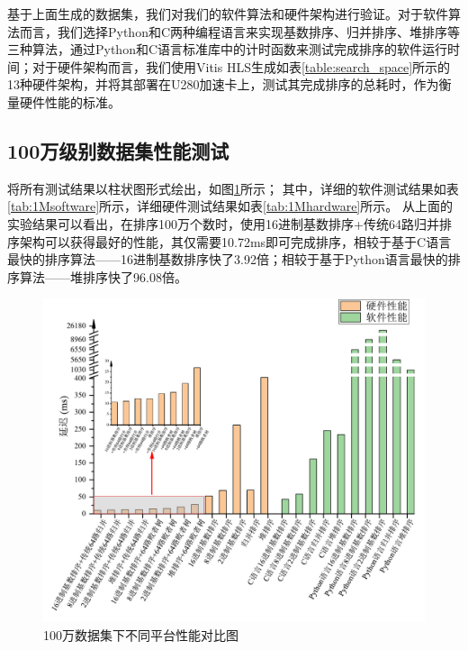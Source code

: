 基于上面生成的数据集，我们对我们的软件算法和硬件架构进行验证。对于软件算法而言，我们选择Python和C两种编程语言来实现基数排序、归并排序、堆排序等三种算法，通过Python和C语言标准库中的计时函数来测试完成排序的软件运行时间；对于硬件架构而言，我们使用Vitis HLS生成如表\ref{table:search_space}所示的13种硬件架构，并将其部署在U280加速卡上，测试其完成排序的总耗时，作为衡量硬件性能的标准。

\subsection{100万级别数据集性能测试}
将所有测试结果以柱状图形式绘出，如图\ref{fig:1MComparison}所示；
其中，详细的软件测试结果如表\ref{tab:1Msoftware}所示，详细硬件测试结果如表\ref{tab:1Mhardware}所示。
从上面的实验结果可以看出，在排序100万个数时，使用16进制基数排序+传统64路归并排序架构可以获得最好的性能，其仅需要10.72ms即可完成排序，相较于基于C语言最快的排序算法——16进制基数排序快了3.92倍；相较于基于Python语言最快的排序算法——堆排序快了96.08倍。

\begin{figure}[htbp]
    \centering
    \includegraphics[width=\linewidth]{figures/1MComparison.pdf}
    \caption{100万数据集下不同平台性能对比图}
    \label{fig:1MComparison}
\end{figure}


